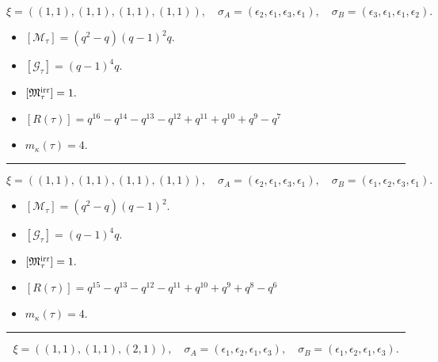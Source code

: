 \documentclass[10pt,a4paper]{amsart}
\begin{document}
$$\xi = ({(1, 1)}, {(1, 1), (1, 1)}, {(1, 1)}),\quad \sigma_A = ({{\epsilon_2}}, {{\epsilon_1}, {\epsilon_3}}, {{\epsilon_1}}),\quad \sigma_B = ({{\epsilon_3}}, {{\epsilon_1}, {\epsilon_1}}, {{\epsilon_2}}).$$

\begin{itemize}
 \item $[\mathcal{M}_{\tau}] = {\left(q^{2} - q\right)} {\left(q - 1\right)}^{2} q .$

 \item $[\mathcal{G}_{\tau}] = {\left(q - 1\right)}^{4} q .$

 \item $[{\frak M}_{\tau}^{\textrm{irr}}] = 1 .$

 \item $[R(\tau)] = q^{16} - q^{14} - q^{13} - q^{12} + q^{11} + q^{10} + q^{9} - q^{7} $

 \item $m_{\kappa}(\tau) = 4 .$

 \end{itemize}
\noindent\rule{8cm}{0.4pt}

$$\xi = ({(1, 1)}, {(1, 1), (1, 1)}, {(1, 1)}),\quad \sigma_A = ({{\epsilon_2}}, {{\epsilon_1}, {\epsilon_3}}, {{\epsilon_1}}),\quad \sigma_B = ({{\epsilon_1}}, {{\epsilon_2}, {\epsilon_3}}, {{\epsilon_1}}).$$

\begin{itemize}
 \item $[\mathcal{M}_{\tau}] = {\left(q^{2} - q\right)} {\left(q - 1\right)}^{2} .$

 \item $[\mathcal{G}_{\tau}] = {\left(q - 1\right)}^{4} q .$

 \item $[{\frak M}_{\tau}^{\textrm{irr}}] = 1 .$

 \item $[R(\tau)] = q^{15} - q^{13} - q^{12} - q^{11} + q^{10} + q^{9} + q^{8} - q^{6} $

 \item $m_{\kappa}(\tau) = 4 .$

 \end{itemize}
\noindent\rule{8cm}{0.4pt}

$$\xi = ({(1, 1)}, {(1, 1)}, {(2, 1)}),\quad \sigma_A = ({{\epsilon_1}}, {{\epsilon_2}}, {{\epsilon_1, \epsilon_3}}),\quad \sigma_B = ({{\epsilon_1}}, {{\epsilon_2}}, {{\epsilon_1, \epsilon_3}}).$$
\end{document}

